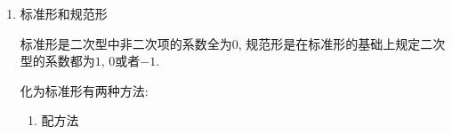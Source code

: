 \begin{enumerate}
\begin{enumerate}
\begin{equation*}
\begin{aligned}
\end{aligned}
\right.
\end{equation*}\par
记$ \bm{x}=\begin{bmatrix}
x_1 \\
x_2 \\
\vdots \\
x_n
\end{bmatrix}, \bm{C}=\begin{bmatrix}
c_{11} & c_{12} & \dots & c_{1n} \\
c_{21} & c_{22} & \dots & c_{2n} \\
\vdots & \vdots &  & \vdots \\
c_{n1} & c_{n2} & \dots & c_{nn}
\end{bmatrix}, \bm{y}=\begin{bmatrix}
y_1 \\
y_2 \\
\vdots \\
y_n
\end{bmatrix}$\par \vspace{1em}
则上式可以写为$ \bm{x}=\bm{C}\bm{y} $. 上式称为从$ y_{1}, y_{2},... ,y_{n} $到$ x_{1}, x_{2},... ,x_{n} $的线性变换. 如果$ \bm{C} $可逆, 则称为可逆线性变换.\par
\item 合同 \par
我们可以把上式$\bm{x}=\bm{C}\bm{y}$代入到$f(\bm{x})=\bm{x}^{T}\bm{A}\bm{x}$, 令$\bm{B}=\bm{C}^{T}\bm{A}\bm{C}$, 可以得到$f(\bm{y}=\bm{y}^{T}\bm{B}\bm{y})$. 其中$\bm{A}$与$\bm{B}$合同, 记为$\bm{A}\simeq \bm{B}$\ (与相似不同的是这里是转置而不是取逆) \par
合同的几个性质:
\begin{enumerate}
\item 反身性, 对称性, 传递性
\item 可逆线性变化不改变矩阵的秩
\item 与对称矩阵合同的矩阵一定也是对称矩阵
\end{enumerate}
\end{enumerate}
\item 标准形和规范形 \par
标准形是二次型中非二次项的系数全为$0$, 规范形是在标准形的基础上规定二次型的系数都为$1$, $0$或者$-1$.\par
化为标准形有两种方法:
\begin{enumerate}
\item 配方法
\begin{equation*}

\end{equation*}
\end{enumerate}
\end{enumerate}
